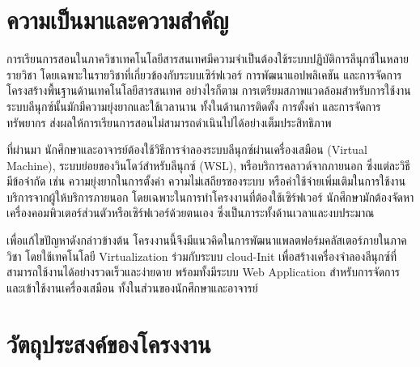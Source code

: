 
\section{ความเป็นมาและความสำคัญ} 

\hspace*{1.3em} %
การเรียนการสอนในภาควิชาเทคโนโลยีสารสนเทศมีความจำเป็นต้องใช้ระบบปฏิบัติการลีนุกซ์ในหลายรายวิชา โดยเฉพาะในรายวิชาที่เกี่ยวข้องกับระบบเซิร์ฟเวอร์ การพัฒนาแอปพลิเคชัน และการจัดการโครงสร้างพื้นฐานด้านเทคโนโลยีสารสนเทศ อย่างไรก็ตาม การเตรียมสภาพแวดล้อมสำหรับการใช้งานระบบลีนุกซ์นั้นมักมีความยุ่งยากและใช้เวลานาน ทั้งในด้านการติดตั้ง การตั้งค่า และการจัดการทรัพยากร ส่งผลให้การเรียนการสอนไม่สามารถดำเนินไปได้อย่างเต็มประสิทธิภาพ

\hspace*{1.3em}
ที่ผ่านมา นักศึกษาและอาจารย์ต้องใช้วิธีการจำลองระบบลีนุกซ์ผ่านเครื่องเสมือน (Virtual Machine), ระบบย่อยของวินโดว์สำหรับลีนุกซ์ (WSL), หรือบริการคลาวด์จากภายนอก ซึ่งแต่ละวิธีมีข้อจำกัด เช่น ความยุ่งยากในการตั้งค่า ความไม่เสถียรของระบบ หรือค่าใช้จ่ายเพิ่มเติมในการใช้งานบริการจากผู้ให้บริการภายนอก โดยเฉพาะในการทำโครงงานที่ต้องใช้เซิร์ฟเวอร์ นักศึกษามักต้องจัดหาเครื่องคอมพิวเตอร์ส่วนตัวหรือเซิร์ฟเวอร์ด้วยตนเอง ซึ่งเป็นภาระทั้งด้านเวลาและงบประมาณ

\hspace*{1.3em}
เพื่อแก้ไขปัญหาดังกล่าวข้างต้น โครงงานนี้จึงมีแนวคิดในการพัฒนาแพลตฟอร์มคลัสเตอร์ภายในภาควิชา โดยใช้เทคโนโลยี Virtualization ร่วมกับระบบ cloud-Init เพื่อสร้างเครื่องจำลองลีนุกซ์ที่สามารถใช้งานได้อย่างรวดเร็วและง่ายดาย พร้อมทั้งมีระบบ Web Application สำหรับการจัดการและเข้าใช้งานเครื่องเสมือน ทั้งในส่วนของนักศึกษาและอาจารย์



\section{วัตถุประสงค์ของโครงงาน}

